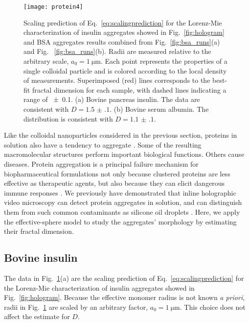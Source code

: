 \begin{figure}[!t]
  \centering
  \texttt{[image: protein4]}
  \caption[Scaling prediction of protein aggregates]
    {Scaling prediction of Eq.~\eqref{eq:scalingprediction} for the Lorenz-Mie 
    characterization of insulin aggregates showed in Fig.~\ref{fig:hologram} and 
    BSA aggregates results combined from Fig.~\ref{fig:bsa_runs}(a) and Fig.~
    \ref{fig:bsa_runs}(b).
    Radii are measured relative to the arbitrary scale, $a_0 = \SI{1}{\um}$.
    Each point represents the properties of a single colloidal
    particle and is colored according to the local density of
    measurements.
    Superimposed (red) lines corresponds to the best-fit
    fractal dimension for each sample, with dashed lines indicating 
    a range of \num{+-0.1}.
    (a) Bovine pancreas insulin.  
    The data are consistent with $D = \num{1.5(1)}$.
    (b) Bovine serum albumin.  The distribution is consistent with 
    $D = \num{1.1(1)}$.}
  \label{fig:protein}
\end{figure}

Like the colloidal nanoparticles considered in the previous section,
proteins in solution also have a tendency to aggregate \cite{morris09}.
Some of the resulting macromolecular structures perform important biological
functions.  Others cause diseases.
Protein aggregation is a principal failure mechanism for biopharmaceutical
formulations not only because clustered proteins are less effective as
therapeutic agents, but also because they can elicit dangerous immune
responses \cite{wang99a}.
We previously have demonstrated that inline holographic video 
microscopy can detect protein aggregates in solution, and can
distinguish them from such common contaminants as silicone oil
droplets \cite{wang16}.
Here, we apply the effective-sphere model to study the aggregates'
morphology by estimating their fractal dimension.

\subsection{Bovine insulin}

The data in Fig.~\ref{fig:protein}(a) are the scaling prediction of 
Eq.~\eqref{eq:scalingprediction} for the Lorenz-Mie characterization of insulin aggregates showed in Fig.~\ref{fig:hologram}.
Because the effective monomer radius is not known \emph{a priori},
radii in Fig.~\ref{fig:protein} are scaled by an arbitrary factor,
$a_0 = \SI{1}{\um}$.  This choice does not affect the
estimate for $D$.


